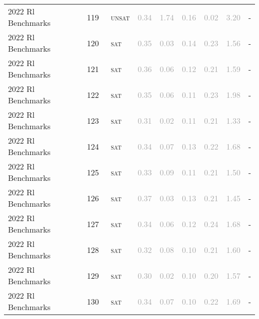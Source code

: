 \begin{center}
{\begin{longtable}{@{}lllllllll@{}}
2022 Rl Benchmarks & 119 & ~\textsc{unsat} & \textcolor{darkgray}{0.34} & \textcolor{darkgray}{1.74} & \textcolor{darkgray}{0.16} & \textcolor{darkgray}{0.02} & \textcolor{darkgray}{3.20} & - \\
2022 Rl Benchmarks & 120 & ~\textsc{sat} & \textcolor{darkgray}{0.35} & \textcolor{darkgray}{0.03} & \textcolor{darkgray}{0.14} & \textcolor{darkgray}{0.23} & \textcolor{darkgray}{1.56} & - \\
2022 Rl Benchmarks & 121 & ~\textsc{sat} & \textcolor{darkgray}{0.36} & \textcolor{darkgray}{0.06} & \textcolor{darkgray}{0.12} & \textcolor{darkgray}{0.21} & \textcolor{darkgray}{1.59} & - \\
2022 Rl Benchmarks & 122 & ~\textsc{sat} & \textcolor{darkgray}{0.35} & \textcolor{darkgray}{0.06} & \textcolor{darkgray}{0.11} & \textcolor{darkgray}{0.23} & \textcolor{darkgray}{1.98} & - \\
2022 Rl Benchmarks & 123 & ~\textsc{sat} & \textcolor{darkgray}{0.31} & \textcolor{darkgray}{0.02} & \textcolor{darkgray}{0.11} & \textcolor{darkgray}{0.21} & \textcolor{darkgray}{1.33} & - \\
2022 Rl Benchmarks & 124 & ~\textsc{sat} & \textcolor{darkgray}{0.34} & \textcolor{darkgray}{0.07} & \textcolor{darkgray}{0.13} & \textcolor{darkgray}{0.22} & \textcolor{darkgray}{1.68} & - \\
2022 Rl Benchmarks & 125 & ~\textsc{sat} & \textcolor{darkgray}{0.33} & \textcolor{darkgray}{0.09} & \textcolor{darkgray}{0.11} & \textcolor{darkgray}{0.21} & \textcolor{darkgray}{1.50} & - \\
2022 Rl Benchmarks & 126 & ~\textsc{sat} & \textcolor{darkgray}{0.37} & \textcolor{darkgray}{0.03} & \textcolor{darkgray}{0.13} & \textcolor{darkgray}{0.21} & \textcolor{darkgray}{1.45} & - \\
2022 Rl Benchmarks & 127 & ~\textsc{sat} & \textcolor{darkgray}{0.34} & \textcolor{darkgray}{0.06} & \textcolor{darkgray}{0.12} & \textcolor{darkgray}{0.24} & \textcolor{darkgray}{1.68} & - \\
2022 Rl Benchmarks & 128 & ~\textsc{sat} & \textcolor{darkgray}{0.32} & \textcolor{darkgray}{0.08} & \textcolor{darkgray}{0.10} & \textcolor{darkgray}{0.21} & \textcolor{darkgray}{1.60} & - \\
2022 Rl Benchmarks & 129 & ~\textsc{sat} & \textcolor{darkgray}{0.30} & \textcolor{darkgray}{0.02} & \textcolor{darkgray}{0.10} & \textcolor{darkgray}{0.20} & \textcolor{darkgray}{1.57} & - \\
2022 Rl Benchmarks & 130 & ~\textsc{sat} & \textcolor{darkgray}{0.34} & \textcolor{darkgray}{0.07} & \textcolor{darkgray}{0.10} & \textcolor{darkgray}{0.22} & \textcolor{darkgray}{1.69} & - \\

\end{longtable}}
\end{center}
